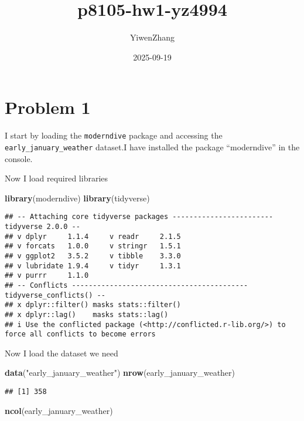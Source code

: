 \documentclass[
]{article}
\title{p8105-hw1-yz4994}
\author{YiwenZhang}
\date{2025-09-19}
\newenvironment{Shaded}{\begin{snugshade}}{\end{snugshade}}
\newcommand{\FunctionTok}[1]{\textcolor[rgb]{0.13,0.29,0.53}{\textbf{#1}}}
\newcommand{\NormalTok}[1]{#1}
\newcommand{\StringTok}[1]{\textcolor[rgb]{0.31,0.60,0.02}{#1}}
\begin{document}
\maketitle

\section{Problem 1}\label{problem-1}

I start by loading the \texttt{moderndive} package and accessing the
\texttt{early\_january\_weather} dataset.I have installed the package
``moderndive'' in the console.

Now I load required libraries

\begin{Shaded}
\begin{Highlighting}[]
\FunctionTok{library}\NormalTok{(moderndive)}
\FunctionTok{library}\NormalTok{(tidyverse)}
\end{Highlighting}
\end{Shaded}

\begin{verbatim}
## -- Attaching core tidyverse packages ------------------------ tidyverse 2.0.0 --
## v dplyr     1.1.4     v readr     2.1.5
## v forcats   1.0.0     v stringr   1.5.1
## v ggplot2   3.5.2     v tibble    3.3.0
## v lubridate 1.9.4     v tidyr     1.3.1
## v purrr     1.1.0     
## -- Conflicts ------------------------------------------ tidyverse_conflicts() --
## x dplyr::filter() masks stats::filter()
## x dplyr::lag()    masks stats::lag()
## i Use the conflicted package (<http://conflicted.r-lib.org/>) to force all conflicts to become errors
\end{verbatim}

Now I load the dataset we need

\begin{Shaded}
\begin{Highlighting}[]
\FunctionTok{data}\NormalTok{(}\StringTok{"early\_january\_weather"}\NormalTok{)}
\FunctionTok{nrow}\NormalTok{(early\_january\_weather)}
\end{Highlighting}
\end{Shaded}

\begin{verbatim}
## [1] 358
\end{verbatim}

\begin{Shaded}
\begin{Highlighting}[]
\FunctionTok{ncol}\NormalTok{(early\_january\_weather)}
\end{Highlighting}
\end{Shaded}
\end{document}
